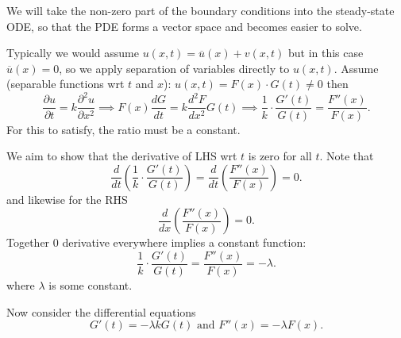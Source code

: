 \documentclass[class=article,crop=false]{standalone}
\begin{document}
\begin{intuition}
	We will take the non-zero part of the boundary conditions into the steady-state ODE, so that the PDE forms a vector space and becomes easier to solve.
\end{intuition}
Typically we would assume $ u(x,t)= \overline{u}(x) + v(x,t)$ but in this case $ \overline{u}(x)=0$, so we apply separation of variables directly to $ u(x,t)$. Assume (separable functions wrt $ t$ and  $ x$): $ u(x,t)=F(x) \cdot G(t) \neq 0$ then
\[
	\frac{\partial u}{\partial t} =k\frac{\partial^2 u}{\partial { x}^2} \implies F(x) \frac{d G}{d t} = k \frac{d^2 F}{d { x }^2} G(t) \implies \frac{1}{k} \cdot \frac{G'(t)}{G(t)} = \frac{F''(x)}{F(x)}
.\] 
For this to satisfy, the ratio must be a constant.
\begin{prf}
We aim to show that the derivative of LHS wrt $ t$ is zero for all $ t$. Note that
\[
	\frac{d }{d t} \left( \frac{1}{k} \cdot  \frac{G'(t)}{G(t)} \right) = \frac{d }{d t} \left( \frac{F''(x)}{F(x)} \right) =0
.\]
and likewise for the RHS
\[
	\frac{d }{d x} \left( \frac{F''(x)}{F(x)} \right) =0 
.\] 
Together 0 derivative everywhere implies a constant function:
\[
	\frac{1}{k} \cdot  \frac{G'(t)}{G(t)}=\frac{F''(x)}{F(x)}=-\lambda
.\] 
where $ \lambda$ is some constant. 
\end{prf}
Now consider the differential equations
\[
	G'(t)=-\lambda k G(t) \text{ and } F''(x) = -\lambda F(x) 
.\] 
\end{document}
